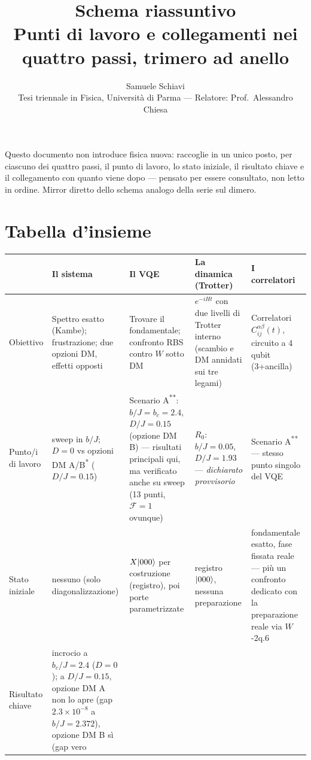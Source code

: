 \documentclass[11pt,a4paper]{article}
\title{\bfseries Schema riassuntivo\\[2pt]
\large Punti di lavoro e collegamenti nei quattro passi, trimero ad anello}
\author{Samuele Schiavi \\ \small Tesi triennale in Fisica, Università di Parma
--- Relatore: Prof.\ Alessandro Chiesa}
\date{}
\begin{document}
\maketitle
\thispagestyle{fancy}

Questo documento non introduce fisica nuova: raccoglie in un unico posto,
per ciascuno dei quattro passi, il punto di lavoro, lo stato iniziale, il
risultato chiave e il collegamento con quanto viene dopo --- pensato per
essere consultato, non letto in ordine. Mirror diretto dello schema
analogo della serie sul dimero.

\section{Tabella d'insieme}

\renewcommand{\arraystretch}{1.35}
\begin{landscape}
\thispagestyle{empty}
\begin{center}
\small
\setlength{\tabcolsep}{4pt}
\begin{tabular}{@{}>{\bfseries\raggedright}p{2.7cm} p{5.15cm} p{5.15cm} p{5.15cm} p{5.15cm}@{}}
\toprule
\rowcolor{grigetto}
 & \textbf{Il sistema} & \textbf{Il VQE} & \textbf{La dinamica (Trotter)} & \textbf{I correlatori} \\
\midrule
Obiettivo &
Spettro esatto (Kambe); frustrazione; due opzioni DM, effetti opposti &
Trovare il fondamentale; confronto RBS contro $W$ sotto DM &
$e^{-iHt}$ con due livelli di Trotter interno (scambio e DM annidati sui
tre legami) &
Correlatori $C_{ij}^{\alpha\beta}(t)$, circuito a 4 qubit (3+ancilla) \\
\addlinespace
Punto/i di lavoro &
sweep in $b/J$; $D=0$ vs opzioni DM A/B\textsuperscript{*} ($D/J=0.15$) &
Scenario A\textsuperscript{**}: $b/J=b_c=2.4$, $D/J=0.15$ (opzione DM B)
--- risultati principali qui, ma verificato anche su sweep (13 punti,
$\mathcal F=1$ ovunque) &
$R_0$: $b/J=0.05$, $D/J=1.93$ --- \emph{dichiarato provvisorio} &
Scenario A\textsuperscript{**} --- stesso punto singolo del VQE \\
\addlinespace
Stato iniziale &
nessuno (solo diagonalizzazione) &
$X\lvert 000\rangle$ per costruzione (registro), poi porte parametrizzate &
registro $\lvert 000\rangle$, nessuna preparazione &
fondamentale esatto, fase fissata reale --- più un confronto dedicato con
la preparazione reale via $W$-2q.6 \\
\addlinespace
Risultato chiave &
incrocio a $b_c/J=2.4$ ($D{=}0$); a $D/J=0.15$, opzione DM A non lo apre
(gap $2.3\times10^{-8}$ a $b/J{=}2.372$), opzione DM B sì (gap vero

\end{tabular}
\end{center}
\end{landscape}
\end{document}
